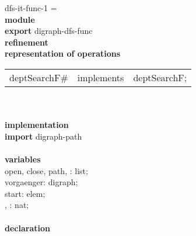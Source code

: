 \begin{tabbing}
dfs-it-func-1 = \\
{\bf mod}\={\bf ule}\+\\
{\bf export} digraph-dfs-func\\
{\bf ref}\={\bf inement}\+\\
{\bf rep}\= {\bf resentation of operations}\+\\
\begin{tabular}{lcl}
deptSearchF\# & implements & deptSearchF;
\end{tabular}\-\\

\\
{\bf implementation}\\
{\bf import} digraph-path\\
\\
{\bf vari}\={\bf ables}\+\\
open, close, path, : list;\\
vorgaenger: digraph;\\
start: elem;\\
, : nat;
\-\\
\\

               {\bf declaration}
\end{tabbing}

